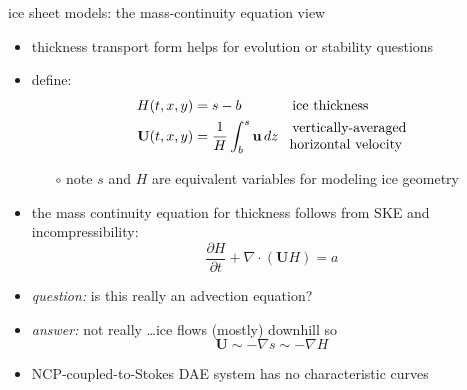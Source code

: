 \documentclass[svgnames,
               hyperref={colorlinks,citecolor=DeepPink4,linkcolor=FireBrick,urlcolor=Maroon},
               usepdftitle=false]  %
               {beamer}
\newcommand{\grad}{\nabla}
\newcommand{\bu}{\mathbf{u}}
\newcommand{\bU}{\mathbf{U}}
\begin{document}
\begin{frame}{ice sheet models: the mass-continuity equation view}

\begin{itemize}
\item thickness transport form helps for evolution or stability questions
\item define:
\begin{align*}
H(t,x,y) &=s-b && \text{ice thickness} \\
\bU(t,x,y) &= \frac{1}{H} \int_b^s \bu \,dz && \begin{matrix} \text{vertically-averaged} \\ \hspace{-1.8mm} \text{horizontal velocity} \end{matrix}
\end{align*}

    \begin{itemize}
    \item[$\circ$] note $s$ and $H$ are equivalent variables for modeling ice geometry
    \end{itemize}
\item the \alert{mass continuity equation} for thickness follows from SKE and incompressibility:
   $$\frac{\partial H}{\partial t} + \nabla \cdot \left(\bU H\right) = a$$

\smallskip
\item<2> \emph{question:} is this really an advection equation?
\item<2>[] \emph{answer:} not really \dots ice flows (mostly) downhill so
  $$\bU \sim - \grad s \sim - \grad H$$
\item<2> NCP-coupled-to-Stokes DAE system has no characteristic curves
\end{itemize}
\end{frame}
\end{document}
